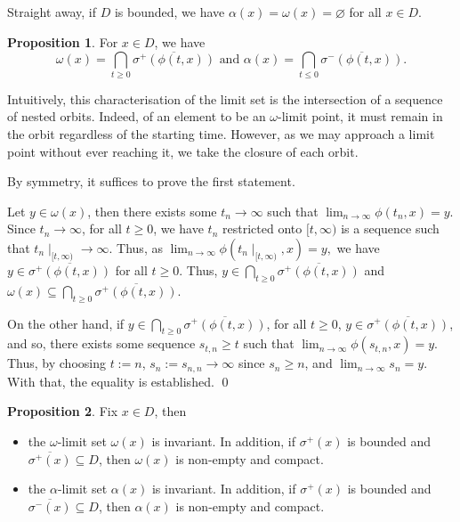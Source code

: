 \documentclass[
]{article}
\theoremstyle{definition}
\newtheorem{prop}{Proposition}
\theoremstyle{definition}
\begin{document}
Straight away, if \(D\) is bounded, we have
\(\alpha(x) = \omega(x) = \varnothing\) for all \(x \in D\).

\begin{prop}
  For \(x \in D\), we have 
  \[\omega(x) = \bigcap_{t \ge 0} \overline{\sigma^+(\phi(t, x))} \text{ and } 
    \alpha(x) = \bigcap_{t \le 0} \overline{\sigma^-(\phi(t, x))}.\]
\end{prop}

Intuitively, this characterisation of the limit set is the intersection
of a sequence of nested orbits. Indeed, of an element to be an
\(\omega\)-limit point, it must remain in the orbit regardless of the
starting time. However, as we may approach a limit point without ever
reaching it, we take the closure of each orbit.

\proof

By symmetry, it suffices to prove the first statement.

Let \(y \in \omega(x)\), then there exists some \(t_n \to \infty\) such
that \(\lim_{n \to \infty} \phi(t_n, x) = y\). Since \(t_n \to \infty\),
for all \(t \ge 0\), we have \(t_n\) restricted onto \([t, \infty)\) is
a sequence such that \(t_n \mid_{[t, \infty)} \to \infty\). Thus, as
\(\lim_{n \to \infty} \phi(t_n \mid_{[t, \infty)}, x) = y,\) we have
\(y \in \overline{\sigma^+(\phi(t, x))}\) for all \(t \ge 0\). Thus,
\(y \in \bigcap_{t \ge 0} \overline{\sigma^+(\phi(t, x))}\) and
\(\omega(x) \subseteq \bigcap_{t \ge 0} \overline{\sigma^+(\phi(t, x))}\).

On the other hand, if
\(y \in \bigcap_{t \ge 0} \overline{\sigma^+(\phi(t, x))}\), for all
\(t \ge 0\), \(y \in \overline{\sigma^+(\phi(t, x))}\), and so, there
exists some sequence \(s_{t, n} \ge t\) such that
\(\lim_{n \to \infty} \phi(s_{t, n}, x) = y\). Thus, by choosing
\(t := n\), \(s_n := s_{n, n} \to \infty\) since \(s_n \ge n\), and
\(\lim_{n \to \infty} s_n = y\). With that, the equality is established.
\qed

\begin{prop}
  Fix \(x \in D\), then 
  \begin{itemize}
    \item the \(\omega\)-limit set \(\omega(x)\) is invariant. In addition, if 
      \(\sigma^+(x)\) is bounded and \(\overline{\sigma^+(x)} \subseteq D\), then 
      \(\omega(x)\) is non-empty and compact.
    \item the \(\alpha\)-limit set \(\alpha(x)\) is invariant. In addition, if 
      \(\sigma^+(x)\) is bounded and \(\overline{\sigma^-(x)} \subseteq D\), then 
      \(\alpha(x)\) is non-empty and compact.
  \end{itemize}
\end{prop}
\proof
\end{document}
